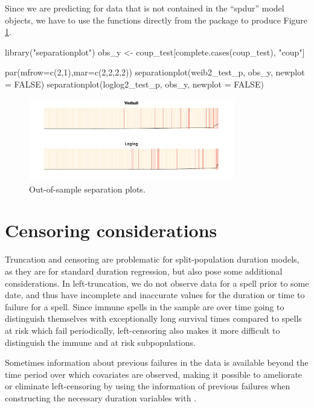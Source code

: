 \documentclass[article]{jss}
\begin{document}
Since we are predicting for data that is not contained in the ``spdur''
model objects, we have to use the  functions
directly from the package to produce Figure \ref{oos-sepplots}.

\begin{CodeChunk}
\begin{CodeInput}
library("separationplot")
obs_y <- coup_test[complete.cases(coup_test), "coup"]

par(mfrow=c(2,1),mar=c(2,2,2,2))
separationplot(weib2_test_p,   obs_y, newplot = FALSE)
separationplot(loglog2_test_p, obs_y, newplot = FALSE)
\end{CodeInput}
\end{CodeChunk}

\begin{figure}
\begin{center}
\includegraphics[width=0.8\textwidth]{graphics/oos-sepplots.pdf}
\caption{Out-of-sample separation plots.}
\label{oos-sepplots}
\end{center}
\end{figure}

\section{Censoring considerations}

Truncation and censoring are problematic for split-population duration
models, as they are for standard duration regression, but also pose some
additional considerations. In left-truncation, we do not observe data
for a spell prior to some date, and thus have incomplete and inaccurate
values for the duration or time to failure for a spell. Since immune
spells in the sample are over time going to distinguish themselves with
exceptionally long survival times compared to spells at risk which fail
periodically, left-censoring also makes it more difficult to distinguish
the immune and at risk subpopulations.

Sometimes information about previous failures in the data is available
beyond the time period over which covariates are observed, making it
possible to ameliorate or eliminate left-censoring by using the
information of previous failures when constructing the necessary
duration variables with .
\end{document}

